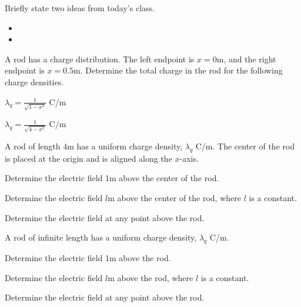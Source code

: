 \begin{problem}
\item Briefly state two ideas from today's class.
  \begin{itemize}
  \item
  \item
  \end{itemize}
  \item A rod has a charge distribution.
    The left endpoint is $x=0$m, and the right endpoint is
    $x=0.5$m. Determine the total charge in the rod for the following
    charge densities.
    \begin{subproblem}
      \item $\lambda_q = \frac{1}{\sqrt{1-x^2}}$ C/m
        \vfill
      \item $\lambda_q = \frac{1}{\sqrt{4-x^2}}$ C/m
        \vfill
    \end{subproblem}
  \item  A rod of length 4m has a uniform charge density, $\lambda_q$ C/m.
    The center of the rod is placed at the origin and is aligned along the
    $x$-axis.
    \begin{subproblem}
      \item Determine the electric field 1m above the center of the rod.
      \item Determine the electric field $l$m above the center of the rod,
        where $l$ is a constant.
      \item Determine the electric field at any point above the rod.
    \end{subproblem}

  \item  A rod of infinite length has a uniform charge density, $\lambda_q$ C/m.
      \begin{subproblem}
        \item Determine the electric field 1m above the rod.
        \item Determine the electric field $l$m above the rod,
          where $l$ is a constant.
        \item Determine the electric field at any point above the rod.
      \end{subproblem}


\end{problem}



